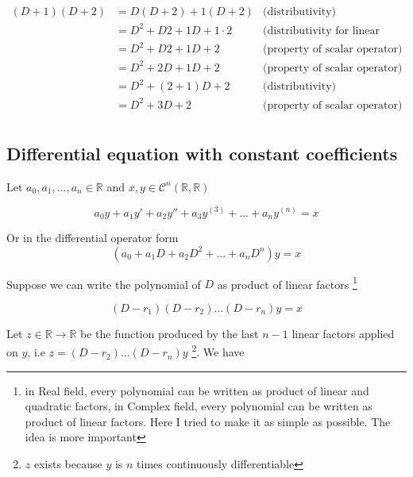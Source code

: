 \documentclass{article}
\begin{document}
\begin{align*}
    (D + 1)(D + 2)  &= D(D+2) + 1(D+2)              &\text{(distributivity)} \\
                    &= D^2 + D2 + 1D + 1 \cdot 2    &\text{(distributivity for linear operator)} \\
                    &= D^2 + D2 + 1D + 2            &\text{(property of scalar operator)} \\
                    &= D^2 + 2D + 1D + 2            &\text{(property of scalar operator)} \\
                    &= D^2 + (2 + 1)D + 2           &\text{(distributivity)} \\
                    &= D^2 + 3D + 2                 &\text{(property of scalar operator)} \\
\end{align*}

\subsection{Differential equation with constant coefficients}

Let $a_0, a_1, ..., a_n \in \mathbb{R}$ and $x, y \in \mathcal{C}^n (\mathbb{R}, \mathbb{R})$

\begin{equation}
    a_0 y + a_1 y' + a_2 y'' + a_3 y^{(3)} + ... + a_n y^{(n)} = x
\end{equation}

Or in the differential operator form
\begin{equation}
    (a_0 + a_1 D + a_2 D^2 + ... + a_n D^n)y = x
\end{equation}

Suppose we can write the polynomial of $D$ as product of linear factors \footnote{in Real field, every polynomial can be written as product of linear and quadratic factors, in Complex field, every polynomial can be written as product of linear factors. Here I tried to make it as simple as possible. The idea is more important}

\begin{equation}
    (D - r_1)(D - r_2)...(D - r_n)y = x
\end{equation}

Let $z \in \mathbb{R} \to \mathbb{R}$ be the function produced by the last $n-1$ linear factors applied on $y$, i.e $z = (D - r_2)...(D - r_n)y$ \footnote{$z$ exists because $y$ is $n$ times continuously differentiable}. We have
\end{document}
